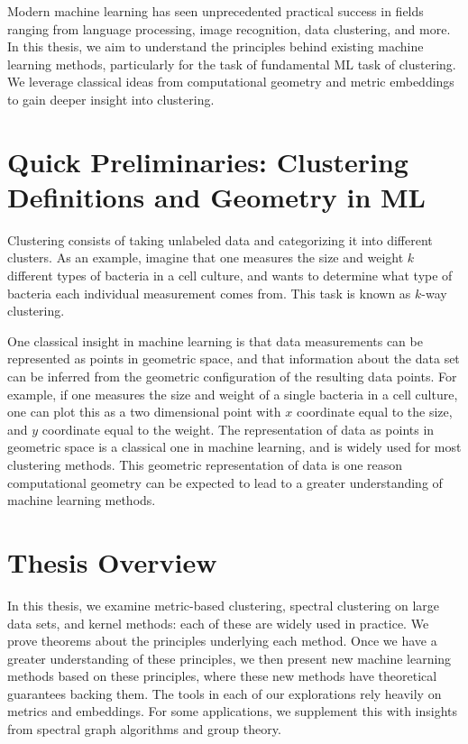Modern machine learning has seen unprecedented practical success in fields ranging
from language processing, image recognition, data clustering, and more.
In this thesis, we aim to understand the principles behind existing
machine learning methods, particularly for the task of fundamental ML
task of clustering. We
leverage classical ideas from computational geometry and metric embeddings to gain deeper
insight into clustering.

\section{Quick Preliminaries: Clustering Definitions and Geometry in ML}

Clustering consists of taking unlabeled data and categorizing it into different
clusters. As an example, imagine that one measures the size and weight
$k$ different types of bacteria in a cell culture, and wants to determine
what type of bacteria each individual measurement comes from.  This task
is known as $k$-way clustering. 

One classical insight in machine learning is that data measurements can
be represented as points in geometric space, and that information about
the data set can be inferred from the geometric configuration of the
resulting data points. For example, if one measures the size and weight
of a single bacteria in a cell culture, one can plot this as a two
dimensional point with $x$ coordinate equal to the size, and $y$
coordinate equal to the weight. The representation of data as points in
geometric space is a classical one in machine learning, and is widely
used for most clustering methods. This geometric
representation of data is one reason computational geometry can be expected to
lead to a greater understanding of machine learning methods.


\section{Thesis Overview}

In this thesis, we examine metric-based clustering, spectral clustering
on large data sets, and kernel methods: each of these are widely used in
practice. We prove theorems about the principles underlying each method.
Once we have a greater understanding of these principles, we then
present new machine learning methods based on these principles, where
these new methods have theoretical guarantees backing them.
The tools in each of our explorations rely heavily on metrics and
embeddings.  For some applications, we supplement this with insights
from spectral graph algorithms and group theory.

